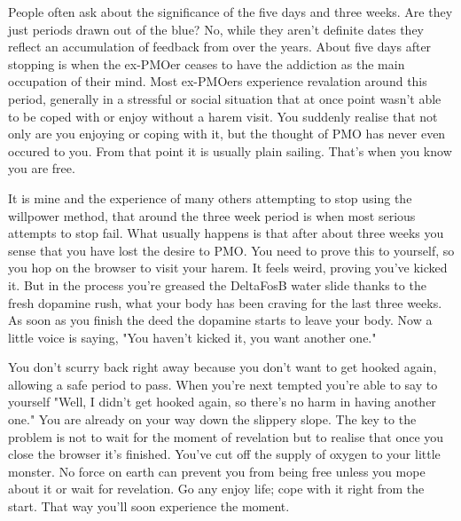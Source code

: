 \documentclass[easypeasy.tex]{subfiles}
\begin{document}
People often ask about the significance of the five days and three weeks. Are they just periods drawn out of the blue? No, while they aren't definite dates they reflect an accumulation of feedback from over the years. About five days after stopping is when the ex-PMOer ceases to have the addiction as the main occupation of their mind. Most ex-PMOers experience revalation around this period, generally in a stressful or social situation that at once point wasn't able to be coped with or enjoy without a harem visit. You suddenly realise that not only are you enjoying or coping with it, but the thought of PMO has never even occured to you. From that point it is usually plain sailing. That's when you know you are free.

It is mine and the experience of many others attempting to stop using the willpower method, that around the three week period is when most serious attempts to stop fail. What usually happens is that after about three weeks you sense that you have lost the desire to PMO. You need to prove this to yourself, so you hop on the browser to visit your harem. It feels weird, proving you've kicked it. But in the process you're greased the DeltaFosB water slide thanks to the fresh dopamine rush, what your body has been craving for the last three weeks. As soon as you finish the deed the dopamine starts to leave your body. Now a little voice is saying, "You haven't kicked it, you want another one."

You don't scurry back right away because you don't want to get hooked again, allowing a safe period to pass. When you're next tempted you're able to say to yourself "Well, I didn't get hooked again, so there's no harm in having another one." You are already on your way down the slippery slope. The key to the problem is not to wait for the moment of revelation but to realise that once you close the browser it's finished. You've cut off the supply of oxygen to your little monster. No force on earth can prevent you from being free unless you mope about it or wait for revelation. Go any enjoy life; cope with it right from the start. That way you'll soon experience the moment.
\end{document}
